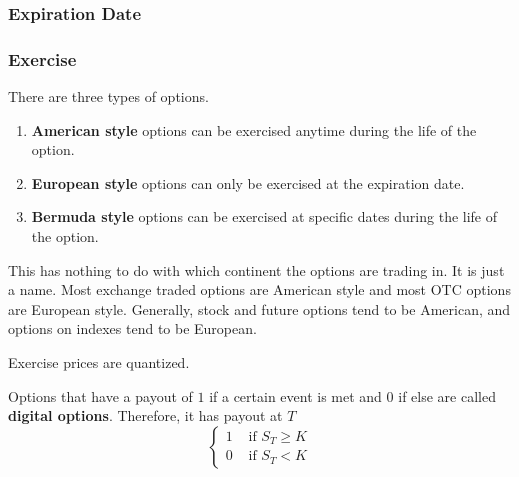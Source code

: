 \documentclass{article}
\begin{document}
    \subsubsection{Expiration Date}

    \subsubsection{Exercise}

      There are three types of options. 
      \begin{enumerate}
        \item \textbf{American style} options can be exercised anytime during the life of the option. 
        \item \textbf{European style} options can only be exercised at the expiration date.
        \item \textbf{Bermuda style} options can be exercised at specific dates during the life of the option.
      \end{enumerate}
      This has nothing to do with which continent the options are trading in. It is just a name. Most exchange traded options are American style and most OTC options are European style. Generally, stock and future options tend to be American, and options on indexes tend to be European. 

      Exercise prices are quantized. 

      \begin{example}
        Options that have a payout of $1$ if a certain event is met and $0$ if else are called \textbf{digital options}. Therefore, it has payout at $T$ 
        \begin{equation}
          \begin{cases} 
            1 & \text{ if } S_T \geq K \\ 
            0 & \text{ if } S_T < K
          \end{cases} 
        \end{equation}
      \end{example}
\end{document}
